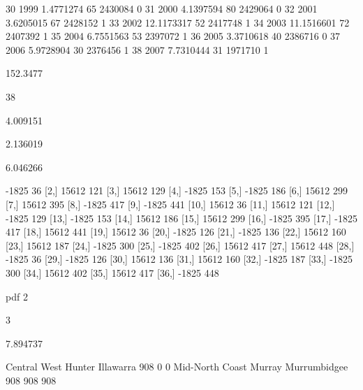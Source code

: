 \documentclass[a4paper]{article}                %
\begin{document}
\begin{Schunk}
\begin{Soutput}
30  1999          1.4771274     65 2430084               0
31  2000          4.1397594     80 2429064               0
32  2001          3.6205015     67 2428152               1
33  2002         12.1173317     52 2417748               1
34  2003         11.1516601     72 2407392               1
35  2004          6.7551563     53 2397072               1
36  2005          3.3710618     40 2386716               0
37  2006          5.9728904     30 2376456               1
38  2007          7.7310444     31 1971710               1
\end{Soutput}
\begin{Soutput}
[1] 152.3477
\end{Soutput}
\begin{Soutput}
[1] 38
\end{Soutput}
\begin{Soutput}
[1] 4.009151
\end{Soutput}
\begin{Soutput}
[1] 2.136019
\end{Soutput}
\begin{Soutput}
[1] 6.046266
\end{Soutput}
\begin{Soutput}
       [,1] [,2]
 [1,] -1825   36
 [2,] 15612  121
 [3,] 15612  129
 [4,] -1825  153
 [5,] -1825  186
 [6,] 15612  299
 [7,] 15612  395
 [8,] -1825  417
 [9,] -1825  441
[10,] 15612   36
[11,] 15612  121
[12,] -1825  129
[13,] -1825  153
[14,] 15612  186
[15,] 15612  299
[16,] -1825  395
[17,] -1825  417
[18,] 15612  441
[19,] 15612   36
[20,] -1825  126
[21,] -1825  136
[22,] 15612  160
[23,] 15612  187
[24,] -1825  300
[25,] -1825  402
[26,] 15612  417
[27,] 15612  448
[28,] -1825   36
[29,] -1825  126
[30,] 15612  136
[31,] 15612  160
[32,] -1825  187
[33,] -1825  300
[34,] 15612  402
[35,] 15612  417
[36,] -1825  448
\end{Soutput}
\begin{Soutput}
pdf 
  2 
\end{Soutput}
\begin{Soutput}
[1] 3
\end{Soutput}
\begin{Soutput}
[1] 7.894737
\end{Soutput}
\begin{Soutput}
         Central West                Hunter             Illawarra 
                  908                     0                     0 
      Mid-North Coast                Murray          Murrumbidgee 
                  908                   908                   908 

\end{Soutput}
\end{Schunk}
\end{document}
